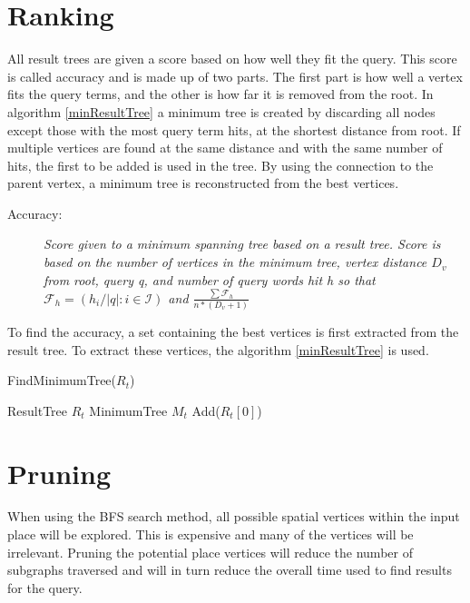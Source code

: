 \section{Ranking}
All result trees are given a score based on how well they fit the query. This score is called accuracy and is made up of two parts. The first part is how well a vertex fits the query terms, and the other is how far it is removed from the root. In algorithm \ref{minResultTree} a minimum tree is created by discarding all nodes except those with the most query term hits, at the shortest distance from root. If multiple vertices are found at the same distance and with the same number of hits, the first to be added is used in the tree. By using the connection to the parent vertex, a minimum tree is reconstructed from the best vertices.
\begin{description}
    \item[Accuracy:] {\em Score given to a minimum spanning tree based on a result tree. Score is based on the number of vertices  in the minimum tree, vertex distance $D_v$ from root, query q, and number of query words hit h so that $\mathcal{F}_h = (h_i/\left\lvert q \right\rvert : i \in \mathcal{I})$ and $ \frac{\sum \mathcal{F}_h}{n*(D_v+1)}$}
\end{description}
To find the accuracy, a set containing the best vertices is first extracted from the result tree. To extract these vertices, the algorithm \ref{minResultTree} is used.

\begin{algorithm}
    \caption{FindMinimumTree($R_t$)}
    \label{minResultTree}
    \SetAlgoLined
    ResultTree $R_t$\; MinimumTree $M_t$ Add($R_t[0]$)\;
\end{algorithm}

\section{Pruning}
\label{pruning}
When using the BFS search method, all possible spatial vertices within the input place will be explored. This is expensive and many of the vertices will be irrelevant. Pruning the potential place vertices will reduce the number of subgraphs traversed and will in turn reduce the overall time used to find results for the query.

